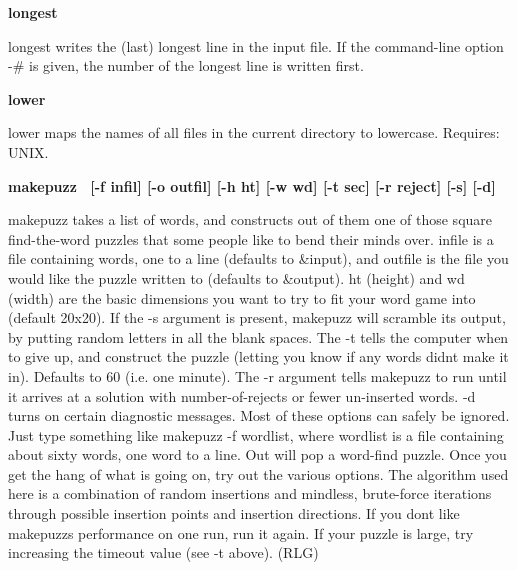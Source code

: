 {{\sffamily\bfseries
longest\ \ \ \ \ \ \ \ \ \ \ \ \ \ \ \ \ \ \ \ }

\textsf{longest} writes the (last) longest line in the input file. If
the command-line option -\# is given, the number of the longest line is
written first. 

{\sffamily\bfseries
lower\ \ \ \ \ \ \ \ \ \ \ \ \ \ \ \ \ \ \ \ \ \ }

\textsf{lower} maps the names of all files in the current directory to
lowercase. Requires: UNIX. 

{\sffamily\bfseries
makepuzz \ \textrm{\textmd{[-f}}\textmd{
}\textrm{\textmd{infil]}}\textmd{ }\textrm{\textmd{[-o}}\textmd{
}\textrm{\textmd{outfil]}}\textmd{ }\textrm{\textmd{[-h}}\textmd{
}\textrm{\textmd{ht]}}\textmd{ }\textrm{\textmd{[-w}}\textmd{
}\textrm{\textmd{wd]}}\textmd{ }\textrm{\textmd{[-t}}\textmd{
}\textrm{\textmd{sec]}}\textmd{ }\textrm{\textmd{[-r}}\textmd{
}\textrm{\textmd{reject]}}\textmd{ }\textrm{\textmd{[-s]}}\textmd{
}\textrm{\textmd{[-d]}}}

\textsf{makepuzz} takes a list of words, and constructs out of them one
of those square find-the-word puzzles that some people like to bend
their minds over. infile is a file containing words, one to a line
(defaults to \textsf{\&input}), and outfile is the file you would like
the puzzle written to (defaults to \textsf{\&output}). \textsf{ht}
(height) and \textsf{wd} (width) are the basic dimensions you want to
try to fit your word game into (default 20x20). If the \textsf{{}-s}
argument is present, \textsf{makepuzz} will scramble its output, by
putting random letters in all the blank spaces. The \textsf{{}-t} tells
the computer when to give up, and construct the puzzle (letting you
know if any words didn{\textquotesingle}t make it in). Defaults to 60
(i.e. one minute). The \textsf{{}-r} argument tells \textsf{makepuzz}
to run until it arrives at a solution with number-of-rejects or fewer
un-inserted words. \textsf{{}-d} turns on certain diagnostic messages.
Most of these options can safely be ignored. Just type something like
\textsf{makepuzz -f wordlist}, where \textsf{wordlist} is a file
containing about sixty words, one word to a line. Out will pop a
{\textquotedbl}word-find{\textquotedbl} puzzle. Once you get the hang
of what is going on, try out the various options. The algorithm used
here is a combination of random insertions and mindless, brute-force
iterations through possible insertion points and insertion directions.
If you don{\textquotesingle}t like \textsf{makepuzz}{\textquotesingle}s
performance on one run, run it again. If your puzzle is large, try
increasing the timeout value (see \textsf{{}-t} above). (RLG)

}
